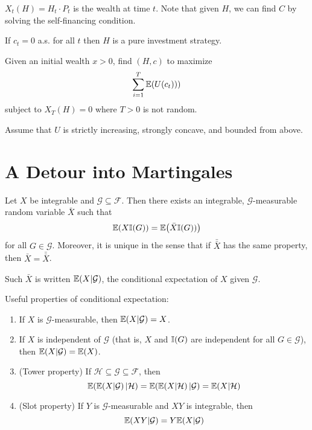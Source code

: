 \begin{notation}
  $X_{t}(H) = H_{t} \cdot P_{t}$ is the wealth at time $t$.
  Note that given $H$, we can find $C$ by solving the self-financing
  condition.
\end{notation}

If $c_{t} = 0$ a.s. for all $t$ then $H$ is a pure investment
strategy. 
\begin{exmp}
  \label{defn:discrete_time_models:3}
  Given an initial wealth $x > 0$, find $(H, c)$ to maximize
  \begin{equation}
    \label{eq:2}
    \sum_{i=1}^{T} \E{U(c_{t}))}
  \end{equation} subject to $X_{T}(H) = 0$ where $T > 0$ is not
  random.

  Assume that $U$ is strictly increasing, strongly concave, and
  bounded from above.
\end{exmp}

\section{A Detour into Martingales}
\label{sec:deto-into-mart}


\begin{proposition}
  Let $X$ be integrable and $\mathcal{G} \subseteq \mathcal{F}$. Then
  there exists an integrable, $\mathcal{G}$-measurable random variable
  $\bar{X}$ such that
  \begin{equation}
    \label{eq:3}
    \E{X \I{G}} = \E{\bar{X} \I{G})}
  \end{equation} for all $G \in \mathcal{G}$.  Moreover, it is unique
  in the sense that if $\bar{\bar{X}}$ has the same property, then $\bar
  X = \bar{\bar{X}}$.
\end{proposition}

\begin{defn}
  \label{defn:discrete_time_models:4}
  Such $\bar X$ is written $\E{X | \mathcal{G}}$, the conditional
  expectation of $X$ given $\mathcal{G}$.
\end{defn}

Useful properties of conditional expectation:
\begin{enumerate}
\item If $X$ is $\mathcal{G}$-measurable, then $\E{X | \mathcal{G}} = X$.
\item If $X$ is independent of $\mathcal{G}$ (that is, $X$ and $\I{G}$
  are independent for all $G \in \mathcal{G}$), then $\E{X |
    \mathcal{G}} = \E{X}$.
\item (Tower property) If $\mathcal{H} \subseteq \mathcal{G}
  \subseteq \mathcal{F}$, then
  \begin{equation}
    \label{eq:4}
    \E{\E{X | \mathcal{G}} | \mathcal{H}} = \E{ \E{X | \mathcal{H}} |
      \mathcal{G}} = \E{X | \mathcal{H}}
  \end{equation}
\item (Slot property) If $Y$ is $\mathcal{G}$-measurable and $XY$ is
  integrable, then
  \begin{equation}
    \label{eq:5}
    \E{XY | \mathcal{G}} = Y \E{X | \mathcal{G}}
  \end{equation}
\end{enumerate}

